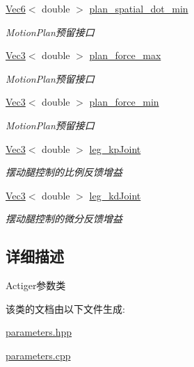 \begin{DoxyCompactItemize}
\mbox{\label{classquadruped_1_1Parameters_a72cc52f05019f45106cabc5d54b763dd}} 
\hyperlink{cppTypes_8h_a27bb8a600520708a5928332e4e52a92e}{Vec6}$<$ double $>$ \hyperlink{classquadruped_1_1Parameters_a72cc52f05019f45106cabc5d54b763dd}{plan\+\_\+spatial\+\_\+dot\+\_\+min}
\begin{DoxyCompactList}\small\item\em Motion\+Plan预留接口 \end{DoxyCompactList}\item 
\mbox{\label{classquadruped_1_1Parameters_a8ce38969650b21333c6ec956aa30b982}} 
\hyperlink{cppTypes_8h_a65c27bf97693676535dd0b30ea0ad399}{Vec3}$<$ double $>$ \hyperlink{classquadruped_1_1Parameters_a8ce38969650b21333c6ec956aa30b982}{plan\+\_\+force\+\_\+max}
\begin{DoxyCompactList}\small\item\em Motion\+Plan预留接口 \end{DoxyCompactList}\item 
\mbox{\label{classquadruped_1_1Parameters_ab3b64eba01c0ec9e369821be596d297d}} 
\hyperlink{cppTypes_8h_a65c27bf97693676535dd0b30ea0ad399}{Vec3}$<$ double $>$ \hyperlink{classquadruped_1_1Parameters_ab3b64eba01c0ec9e369821be596d297d}{plan\+\_\+force\+\_\+min}
\begin{DoxyCompactList}\small\item\em Motion\+Plan预留接口 \end{DoxyCompactList}\item 
\mbox{\label{classquadruped_1_1Parameters_ab0f37a003a886535cbc567144597135d}} 
\hyperlink{cppTypes_8h_a65c27bf97693676535dd0b30ea0ad399}{Vec3}$<$ double $>$ \hyperlink{classquadruped_1_1Parameters_ab0f37a003a886535cbc567144597135d}{leg\+\_\+kp\+Joint}
\begin{DoxyCompactList}\small\item\em 摆动腿控制的比例反馈增益 \end{DoxyCompactList}\item 
\mbox{\label{classquadruped_1_1Parameters_ac9f5600ab7b12d4d2a7f17bc8f203975}} 
\hyperlink{cppTypes_8h_a65c27bf97693676535dd0b30ea0ad399}{Vec3}$<$ double $>$ \hyperlink{classquadruped_1_1Parameters_ac9f5600ab7b12d4d2a7f17bc8f203975}{leg\+\_\+kd\+Joint}
\begin{DoxyCompactList}\small\item\em 摆动腿控制的微分反馈增益 \end{DoxyCompactList}\end{DoxyCompactItemize}


\subsection{详细描述}
Actiger参数类 

该类的文档由以下文件生成\+:\begin{DoxyCompactItemize}
\item 
\hyperlink{parameters_8hpp}{parameters.\+hpp}\item 
\hyperlink{parameters_8cpp}{parameters.\+cpp}\end{DoxyCompactItemize}
